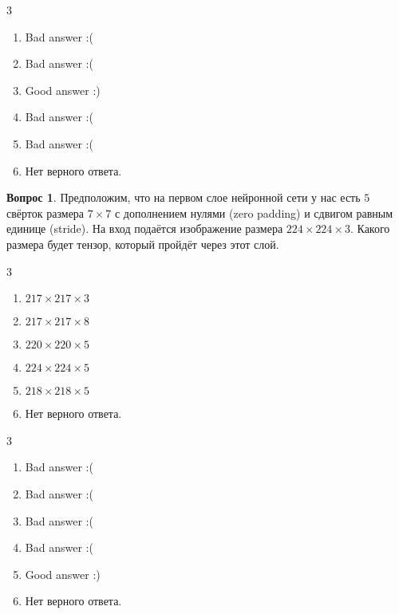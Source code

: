 \documentclass[12pt]{article}
\newenvironment{answerlist}[1][3]{
\begin{multicols}{#1}

\begin{enumerate}[label=\fbox{\emph{\Alph*}},ref=\emph{\alph*}]
}
{
\item Нет верного ответа.
\end{enumerate}
\end{multicols}
}
\theoremstyle{definition}
\newtheorem{question}{Вопрос}
\begin{document}
\begin{solution}
\begin{answerlist}
  \item Bad answer :(
  \item Bad answer :(
  \item Good answer :)
  \item Bad answer :(
  \item Bad answer :(
\end{answerlist}
\end{solution}

\newpage 

\begin{question}
Предположим, что на первом слое нейронной сети у нас есть $5$ свёрток размера $7 \times 7$ с дополнением нулями (zero padding) и сдвигом равным единице (stride). На вход подаётся изображение размера $224 \times 224 \times 3$. Какого размера будет тензор, который пройдёт через этот слой.  
\begin{answerlist}
  \item $217 \times 217 \times 3$
  \item $217 \times 217 \times 8$
  \item $220 \times 220 \times 5$
  \item $224 \times 224 \times 5$
  \item $218 \times 218 \times 5$
\end{answerlist}
\end{question}

\begin{solution}
\begin{answerlist}
  \item Bad answer :(
  \item Bad answer :(
  \item Bad answer :(
  \item Bad answer :(
  \item Good answer :)
\end{answerlist}
\end{solution}
 
\end{document}
